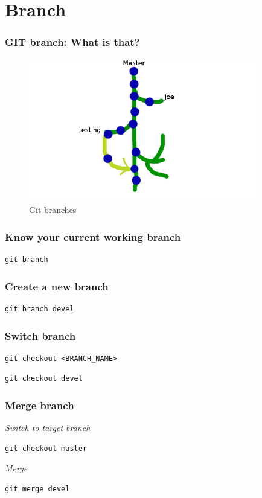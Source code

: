 \documentclass[bigger, presentation]{beamer}
\begin{document}
\section{Branch}
\label{sec-3}
\begin{frame}
\frametitle{GIT branch: What is that?}
\label{sec-3-1}



  \begin{figure}[htb]
  \centering
  \includegraphics[width=10cm,angle=0]{./branch.png}
  \caption{\label{fig:branch}Git branches}
  \end{figure}
\end{frame}
\begin{frame}[fragile]
\frametitle{Know your current working branch}
\label{sec-3-2}



\begin{verbatim}
git branch
\end{verbatim}
\end{frame}
\begin{frame}[fragile]
\frametitle{Create a new branch}
\label{sec-3-3}



\begin{verbatim}
git branch devel
\end{verbatim}
\end{frame}
\begin{frame}[fragile]
\frametitle{Switch branch}
\label{sec-3-4}



\begin{verbatim}
git checkout <BRANCH_NAME>
\end{verbatim}


\begin{verbatim}
git checkout devel
\end{verbatim}
\end{frame}
\begin{frame}[fragile]
\frametitle{Merge branch}
\label{sec-3-5}


   \emph{Switch to target branch}

\begin{verbatim}
git checkout master
\end{verbatim}

   \emph{Merge}

\begin{verbatim}
git merge devel
\end{verbatim}
\end{frame}
\end{document}
